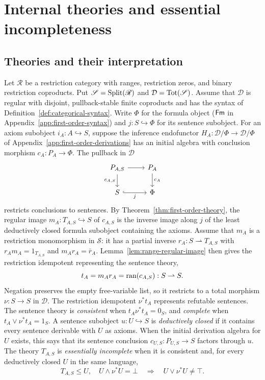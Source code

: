 \section{Internal theories and essential incompleteness}\label{sec:internal-theories}

\subsection{Theories and their interpretation}\label{subsec:theories-and-interpretation}

Let $\mathscr R$ be a restriction category with ranges, restriction
zeros, and binary restriction coproducts. Put
$\mathscr S=\operatorname{Split}(\mathscr R)$ and $\mathcal D=\operatorname{Tot}(\mathscr S)$.
Assume that $\mathcal D$ is regular with disjoint, pullback-stable finite
coproducts and has the syntax of Definition~\ref{def:categorical-syntax}.
Write $\Phi$ for the formula object ($\mathsf{Fm}$ in Appendix~\ref{app:first-order-syntax})
and $j:S\hookrightarrow\Phi$ for its sentence subobject. For an axiom
subobject $i_A:A\hookrightarrow S$, suppose the inference
endofunctor $H_A:\mathcal D/\Phi\to\mathcal D/\Phi$ of
Appendix~\ref{app:first-order-derivations} has an initial algebra
with conclusion morphism $c_A:P_A\to\Phi$.
The pullback in $\mathcal D$
\[
\begin{tikzcd}
 P_{A,S}\arrow[r]\arrow[d,"c_{A,S}"'] & P_A\arrow[d,"c_A"]\\
 S\arrow[r,hook,"j"'] & \Phi
\end{tikzcd}
\]
restricts conclusions to sentences. By
Theorem~\ref{thm:first-order-theory}, the regular image
$m_A:T_{A,S}\hookrightarrow S$ of $c_{A,S}$ is the inverse image along $j$ of the least deductively closed formula
subobject containing the axioms. Assume that $m_A$ is a restriction monomorphism in
$\mathscr S$: it has a partial inverse
$r_A:S\rightharpoonup T_{A,S}$ with
$r_A m_A=1_{T_{A,S}}$ and $m_A r_A=\bar r_A$.
Lemma~\ref{lem:range-regular-image} then gives the restriction
idempotent representing the sentence theory,
\[
 t_A=m_A r_A=\operatorname{ran}(c_{A,S}):S\rightharpoonup S.
\]
Negation preserves the empty free-variable list, so it restricts
to a total morphism $\nu:S\to S$ in $\mathcal D$.
The restriction idempotent $\nu^*t_A$ represents refutable sentences.
The sentence theory is \emph{consistent} when
$t_A\nu^*t_A=0_S$, and \emph{complete} when
$t_A\vee\nu^*t_A=1_S$.
A sentence subobject $u:U\hookrightarrow S$ is \emph{deductively closed}
if it contains every sentence derivable with $U$ as axioms. When the initial
derivation algebra for $U$ exists, this says that its sentence conclusion
$c_{U,S}:P_{U,S}\to S$ factors through $u$.
The theory $T_{A,S}$ is \emph{essentially incomplete} when it is consistent
and, for every deductively closed $U$ in the same language,
\[
 T_{A,S}\leq U,\quad U\wedge\nu^*U=\bot
 \quad\Longrightarrow\quad U\vee\nu^*U\ne\top.
\]

